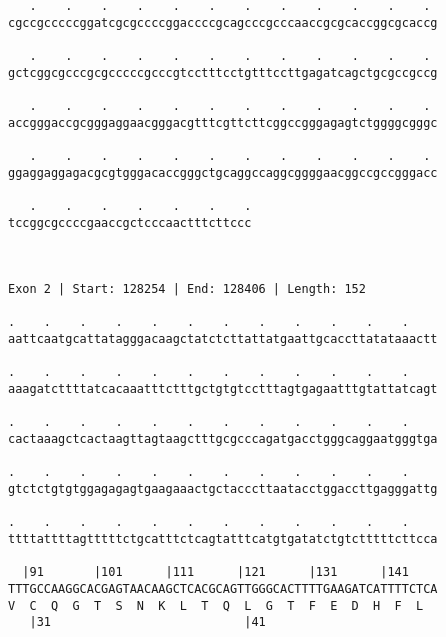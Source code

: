 \documentclass{article}
\begin{document}
\begin{Verbatim}
   .    .    .    .    .    .    .    .    .    .    .    . 
cgccgcccccggatcgcgccccggaccccgcagcccgcccaaccgcgcaccggcgcaccg
                                                            
   .    .    .    .    .    .    .    .    .    .    .    . 
gctcggcgcccgcgcccccgcccgtcctttcctgtttccttgagatcagctgcgccgccg
                                                            
   .    .    .    .    .    .    .    .    .    .    .    . 
accgggaccgcgggaggaacgggacgtttcgttcttcggccgggagagtctggggcgggc
                                                            
   .    .    .    .    .    .    .    .    .    .    .    . 
ggaggaggagacgcgtgggacaccgggctgcaggccaggcggggaacggccgccgggacc
                                                            
   .    .    .    .    .    .    .
tccggcgccccgaaccgctcccaactttcttccc
                                  
                                  
 
Exon 2 | Start: 128254 | End: 128406 | Length: 152
 
.    .    .    .    .    .    .    .    .    .    .    .    
aattcaatgcattatagggacaagctatctcttattatgaattgcaccttatataaactt
                                                            
.    .    .    .    .    .    .    .    .    .    .    .    
aaagatcttttatcacaaatttctttgctgtgtcctttagtgagaatttgtattatcagt
                                                            
.    .    .    .    .    .    .    .    .    .    .    .    
cactaaagctcactaagttagtaagctttgcgcccagatgacctgggcaggaatgggtga
                                                            
.    .    .    .    .    .    .    .    .    .    .    .    
gtctctgtgtggagagagtgaagaaactgctacccttaatacctggaccttgagggattg
                                                            
.    .    .    .    .    .    .    .    .    .    .    .    
ttttattttagtttttctgcatttctcagtatttcatgtgatatctgtctttttcttcca
                                                            
  |91       |101      |111      |121      |131      |141    
TTTGCCAAGGCACGAGTAACAAGCTCACGCAGTTGGGCACTTTTGAAGATCATTTTCTCA
V  C  Q  G  T  S  N  K  L  T  Q  L  G  T  F  E  D  H  F  L  
   |31                           |41                        
  

\end{Verbatim}
\end{document}

